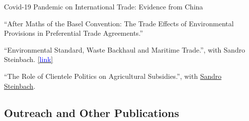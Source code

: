 \documentclass[11 pt,letterpaper]{article}
\renewenvironment{itemize}{
	\begin{list}{}{
			\setlength{\leftmargin}{1.5em}
		}
	}{
	\end{list}
}
\begin{document}
 \begin{itemize}
 	\item[-] Covid-19 Pandemic on International Trade: Evidence from China 
 	
 	\item[-] ``After Maths of the Basel Convention: The Trade Effects of Environmental Provisions in Preferential Trade Agreements.''
 	 	
 	
 	\item[-] ``Environmental Standard, Waste Backhaul and Maritime Trade.'',
 	with Sandro Steinbach. 
 	\href{https://scholar.google.com/citations?view_op=view_citation&hl=en&user=gSddLM4AAAAJ&citation_for_view=gSddLM4AAAAJ:9yKSN-GCB0IC}{[{\underline{\textcolor{blue}{link}}}]}
 	
 
 	
 	\item[-] ``The Role of Clientele Politics on Agricultural Subsidies.'',
 	with
 	\href{https://are.uconn.edu/person/sandro-steinbach/}{Sandro Steinbach}.   
 	

 	
 	

 	
 \end{itemize}
 

\subsection*{\textbf{Outreach and Other Publications}}
\end{document}
